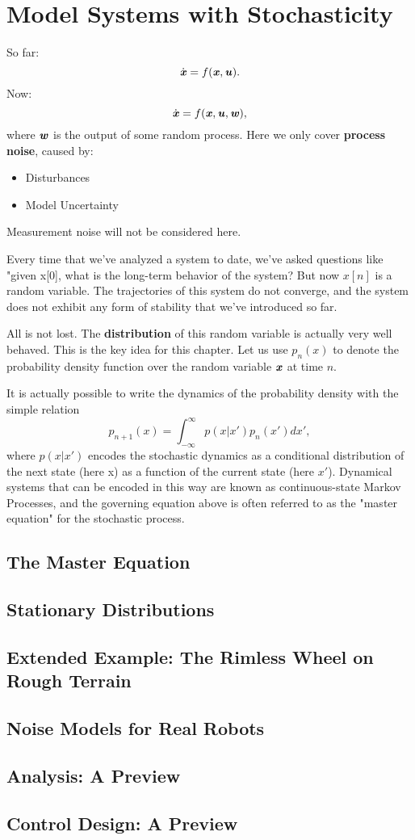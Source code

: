 \chapter{Model Systems with Stochasticity}
So far: 
$$\dot{\bm{\mathit{x}}}=f(\bm{\mathit{x}},\bm{\mathit{u}}).$$
Now: 
$$\dot{\bm{\mathit{x}}}=f(\bm{\mathit{x}},\bm{\mathit{u}},\bm{\mathit{w}}),$$
where $\bm{\mathit{w}}$ is the output of some random process. Here we only cover \textbf{process noise}, caused by:
\begin{itemize}
\item Disturbances
\item Model Uncertainty
\end{itemize}
Measurement noise will not be considered here.

Every time that we've analyzed a system to date, we've asked questions like "given x[0], what is the long-term behavior of the system? But now $x[n]$ is a random variable. The trajectories of this system do not converge, and the system does not exhibit any form of stability that we've introduced so far. 


All is not lost. The \textbf{distribution} of this random variable is actually very well behaved. This is the key idea for this chapter. Let us use $p_n(x)$ to denote the probability density function over the random variable $\bm{\mathit{x}}$ at time $n$.

It is actually possible to write the dynamics of the probability density with the simple relation 
$$p_{n+1}(x) = \int_{-\infty}^\infty p(x|x') p_n(x') dx',$$
where $p(x|x')$ encodes the stochastic dynamics as a conditional distribution of the next state (here x) as a function of the current state (here $x'$). Dynamical systems that can be encoded in this way are known as continuous-state Markov Processes, and the governing equation above is often referred to as the "master equation" for the stochastic process.

\section{The Master Equation}
\section{Stationary Distributions}
\section{Extended Example: The Rimless Wheel on Rough Terrain}
\section{Noise Models for Real Robots}
\section{Analysis: A Preview}
\section{Control Design: A Preview}